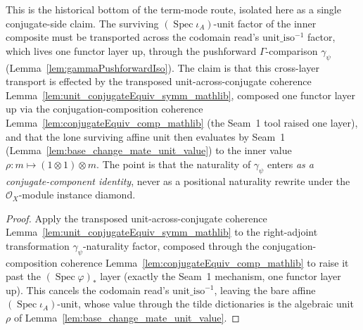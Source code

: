 \begin{lemma}

  \label{lem:base_change_mate_reindex_conj_crossLayer}
  This is the historical bottom of the term-mode route, isolated here as a single conjugate-side claim.
  The surviving \((\operatorname{Spec}\iota_A)\)-unit factor of the inner composite must be transported
  across the codomain read's \(\mathrm{unit\_iso}^{-1}\) factor, which lives one functor layer up,
  through the pushforward \(\Gamma\)-comparison \(\gamma_\psi\) (Lemma~\ref{lem:gammaPushforwardIso}).
  The claim is that this cross-layer transport is effected by the transposed unit-across-conjugate
  coherence Lemma~\ref{lem:unit_conjugateEquiv_symm_mathlib}, composed one functor layer up via the
  conjugation-composition coherence Lemma~\ref{lem:conjugateEquiv_comp_mathlib} (the Seam~1 tool raised
  one layer), and that the lone surviving affine unit then evaluates by Seam~1
  (Lemma~\ref{lem:base_change_mate_unit_value}) to the inner value
  \(\rho : m \mapsto (1 \otimes 1) \otimes m\). The point is that the naturality of \(\gamma_\psi\)
  enters \emph{as a conjugate-component identity}, never as a positional naturality rewrite under the
  \(\mathcal{O}_X\)-module instance diamond.
\end{lemma}

\begin{proof}
  Apply the transposed unit-across-conjugate coherence
  Lemma~\ref{lem:unit_conjugateEquiv_symm_mathlib} to the right-adjoint transformation
  \(\gamma_\psi\)-naturality factor, composed through the conjugation-composition coherence
  Lemma~\ref{lem:conjugateEquiv_comp_mathlib} to raise it past the
  \((\operatorname{Spec}\varphi)_*\) layer (exactly the Seam~1 mechanism, one functor layer up). This
  cancels the codomain read's \(\mathrm{unit\_iso}^{-1}\), leaving the bare affine
  \((\operatorname{Spec}\iota_A)\)-unit, whose value through the tilde dictionaries is the algebraic unit
  \(\rho\) of Lemma~\ref{lem:base_change_mate_unit_value}.
\end{proof}

